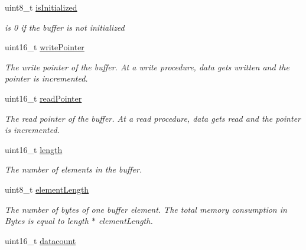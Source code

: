 \begin{DoxyCompactItemize}
\item 
\hypertarget{structbuffer__t_a226b259859e359bec68028e844a29d13}{}uint8\+\_\+t \hyperlink{structbuffer__t_a226b259859e359bec68028e844a29d13}{is\+Initialized}\label{structbuffer__t_a226b259859e359bec68028e844a29d13}

\begin{DoxyCompactList}\small\item\em is 0 if the buffer is not initialized \end{DoxyCompactList}\item 
\hypertarget{structbuffer__t_a497ab79d85c05cf11b3042d27c5a0dbb}{}uint16\+\_\+t \hyperlink{structbuffer__t_a497ab79d85c05cf11b3042d27c5a0dbb}{write\+Pointer}\label{structbuffer__t_a497ab79d85c05cf11b3042d27c5a0dbb}

\begin{DoxyCompactList}\small\item\em The write pointer of the buffer. At a write procedure, data gets written and the pointer is incremented. \end{DoxyCompactList}\item 
\hypertarget{structbuffer__t_aae80b6cbad55ddcee74d93a23af7f88f}{}uint16\+\_\+t \hyperlink{structbuffer__t_aae80b6cbad55ddcee74d93a23af7f88f}{read\+Pointer}\label{structbuffer__t_aae80b6cbad55ddcee74d93a23af7f88f}

\begin{DoxyCompactList}\small\item\em The read pointer of the buffer. At a read procedure, data gets read and the pointer is incremented. \end{DoxyCompactList}\item 
\hypertarget{structbuffer__t_a1892eba2086d12ac2b09005aeb09ea3b}{}uint16\+\_\+t \hyperlink{structbuffer__t_a1892eba2086d12ac2b09005aeb09ea3b}{length}\label{structbuffer__t_a1892eba2086d12ac2b09005aeb09ea3b}

\begin{DoxyCompactList}\small\item\em The number of elements in the buffer. \end{DoxyCompactList}\item 
\hypertarget{structbuffer__t_ad42232a8a992b5d0eb9daf58d83337ec}{}uint8\+\_\+t \hyperlink{structbuffer__t_ad42232a8a992b5d0eb9daf58d83337ec}{element\+Length}\label{structbuffer__t_ad42232a8a992b5d0eb9daf58d83337ec}

\begin{DoxyCompactList}\small\item\em The number of bytes of one buffer element. The total memory consumption in Bytes is equal to length $\ast$ element\+Length. \end{DoxyCompactList}\item 
\hypertarget{structbuffer__t_ac7e5e46f55ed6f23cd0c8630ca768f8b}{}uint16\+\_\+t \hyperlink{structbuffer__t_ac7e5e46f55ed6f23cd0c8630ca768f8b}{datacount}\label{structbuffer__t_ac7e5e46f55ed6f23cd0c8630ca768f8b}


\end{DoxyCompactItemize}
